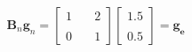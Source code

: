\documentclass[preview]{standalone}
\begin{document}
\begin{align*}
\mathbf{B}_n \mathbf{g}_n = \begin{bmatrix} 1 & \quad 2 \\ \\0 & \quad 1 \end{bmatrix}\begin{bmatrix} 1.5 \\ \\ 0.5 \end{bmatrix}= \mathbf{g_e}
\end{align*}
\end{document}
